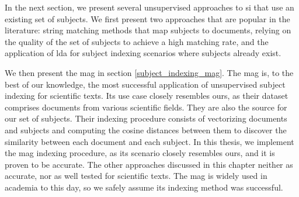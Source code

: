 In the next section, we present several unsupervised approaches to \acrshort{si} that use an existing set of subjects. We first present two approaches that are popular in the literature: string matching methods that map subjects to documents, relying on the quality of the set of subjects to achieve a high matching rate, and the application of \acrlong{lda} for subject indexing scenarios where subjects already exist.

We then present the \acrfull{mag} in section \ref{subject_indexing_mag}. The \acrshort{mag} is, to the best of our knowledge, the most successful application of unsupervised subject indexing for scientific texts. Its use case closely resembles ours, as their dataset comprises documents from various scientific fields. They are also the source for our set of subjects. Their indexing procedure consists of vectorizing documents and subjects and computing the cosine distances between them to discover the similarity between each document and each subject. In this thesis, we implement the \acrshort{mag} indexing procedure, as its scenario closely resembles ours, and it is proven to be accurate. The other approaches discussed in this chapter neither as accurate, nor as well tested for scientific texts. The \acrshort{mag} is widely used in academia to this day, so we safely assume its indexing method was successful.





